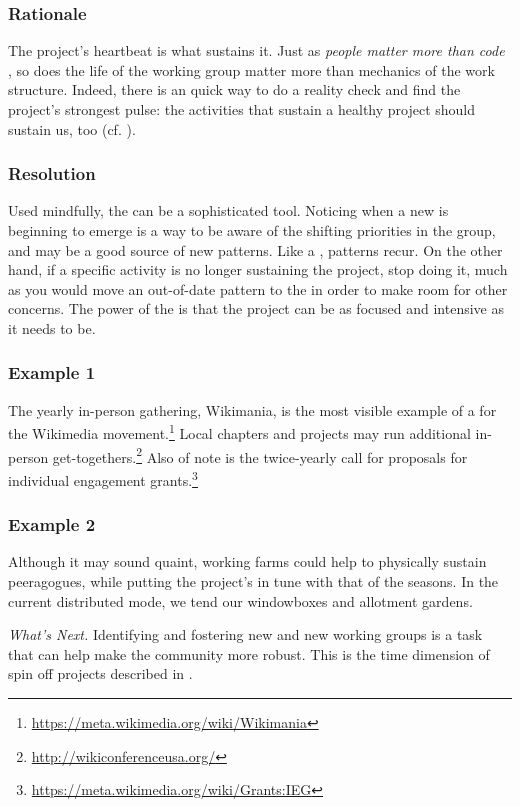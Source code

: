 \subsubsection*{Rationale}  The project's heartbeat is what sustains it. Just as \emph{people matter more than code} \cite{torvalds-interview}, so does the life of the working group matter more than mechanics of the work structure.  Indeed, there is an quick way to do a reality check and find the project's strongest pulse: the activities that sustain a healthy project should sustain us, too (cf. ).

\subsubsection*{Resolution} Used mindfully, the  can be a sophisticated tool.  Noticing when a new  is beginning to emerge is a way to be aware of the shifting priorities in the group, and may be a good source of new patterns.  Like a , patterns recur.  On the other hand, if a specific activity is no longer sustaining the project, stop doing it, much as you would move an out-of-date pattern to the  in order to make room for other concerns.
%
The power of the  is that the project can be as focused and intensive as it needs to be.

\subsubsection*{Example 1} The yearly in-person gathering, Wikimania, is the most visible
example of a  for the Wikimedia movement.\footnote{\url{https://meta.wikimedia.org/wiki/Wikimania}}
Local chapters and projects may run additional in-person get-togethers.\footnote{\url{http://wikiconferenceusa.org/}}
Also of note is the twice-yearly call for proposals for individual
engagement grants.\footnote{\url{https://meta.wikimedia.org/wiki/Grants:IEG}}

\subsubsection*{Example 2} Although it may sound quaint, working farms could help to physically
sustain peeragogues, while putting the project's  in tune with that of the seasons.  In the
current distributed mode, we tend our windowboxes and allotment gardens.

\begin{framed}
\noindent 
\emph{What's Next.}
Identifying and fostering new  and new working groups is a task that can help make the community more robust.  This is the time dimension of spin off projects described in .
\end{framed}


